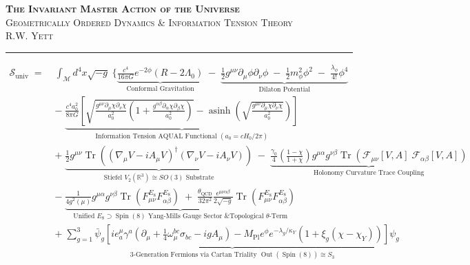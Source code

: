 \documentclass[10pt,letterpaper]{article}
\begin{document}
\begin{center}
  {\LARGE\bfseries\textsc{The Invariant Master Action of the Universe}}\\[0.3em]
  {\Large\textsc{Geometrically Ordered Dynamics \& Information Tension Theory}}\\[0.2em]
  {\normalsize\textsc{R.W. Yett}}\\[0.3em]
  \rule{\textwidth}{1.2pt}
\end{center}

\vspace{-0.5em}

\begin{actionbox}
\begin{align*}
\mathcal{S}_{\mathrm{univ}} \;=\;& \int_{\mathcal{M}} d^4x \sqrt{-g} \;\Bigg\{ 
\underbrace{\frac{c^4}{16\pi G} e^{-2\phi} \left( R - 2\Lambda_0 \right)}_{\text{Conformal Gravitation}} 
\;-\; \underbrace{\frac{1}{2} g^{\mu\nu} \partial_\mu\phi \partial_\nu\phi \;-\; \frac{1}{2} m_\phi^2 \phi^2 \;-\; \frac{\lambda_\phi}{4!} \phi^4}_{\text{Dilaton Potential}} \\[0.8em]
&-\; \underbrace{\frac{c^4 a_0^2}{8\pi G} \left[ \sqrt{\frac{g^{\mu\nu}\partial_\mu\chi\partial_\nu\chi}{a_0^2}\left(1 + \frac{g^{\alpha\beta}\partial_\alpha\chi\partial_\beta\chi}{a_0^2}\right)} - \operatorname{asinh}\left(\sqrt{\frac{g^{\mu\nu}\partial_\mu\chi\partial_\nu\chi}{a_0^2}}\right) \right]}_{\text{Information Tension AQUAL Functional } (a_0 = cH_0 / 2\pi)} \\[0.8em]
&+\; \underbrace{\frac{1}{2} g^{\mu\nu} \operatorname{Tr}\left( (\nabla_\mu V - i A_\mu V)^\dagger (\nabla_\nu V - i A_\nu V) \right)}_{\text{Stiefel } V_2(\mathbb{R}^3) \cong SO(3) \text{ Substrate}} 
\;-\; \underbrace{\frac{\gamma_0}{4}\left(\frac{1-\chi}{1+\chi}\right) g^{\mu\alpha} g^{\nu\beta} \operatorname{Tr}\left( \mathcal{F}_{\mu\nu}[V,A] \; \mathcal{F}_{\alpha\beta}[V,A] \right)}_{\text{Holonomy Curvature Trace Coupling}} \\[0.8em]
&-\; \underbrace{\frac{1}{4 g^2(\mu)} g^{\mu\alpha} g^{\nu\beta} \operatorname{Tr}\left( F_{\mu\nu}^{E_8} F_{\alpha\beta}^{E_8} \right) \;+\; \frac{\theta_{\mathrm{QCD}}}{32\pi^2} \frac{\epsilon^{\mu\nu\alpha\beta}}{2\sqrt{-g}} \operatorname{Tr}\left( F_{\mu\nu}^{E_8} F_{\alpha\beta}^{E_8} \right)}_{\text{Unified } E_8 \supset \operatorname{Spin}(8) \text{ Yang-Mills Gauge Sector \& Topological } \theta\text{-Term}} \\[0.8em]
&+\; \underbrace{\sum_{g=1}^3 \bar{\psi}_g \left[ i e^\mu_a \gamma^a \left( \partial_\mu + \frac{1}{4}\omega_\mu^{bc}\sigma_{bc} - i g A_\mu \right) - M_{\mathrm{Pl}} e^\phi e^{-\lambda_g/\kappa_Y} \left(1 + \xi_g(\chi - \chi_Y)\right) \right] \psi_g}_{\text{3-Generation Fermions via Cartan Triality } \operatorname{Out}(\operatorname{Spin}(8)) \cong S_3} \\[0.8em]

\end{align*}
\end{actionbox}
\end{document}
